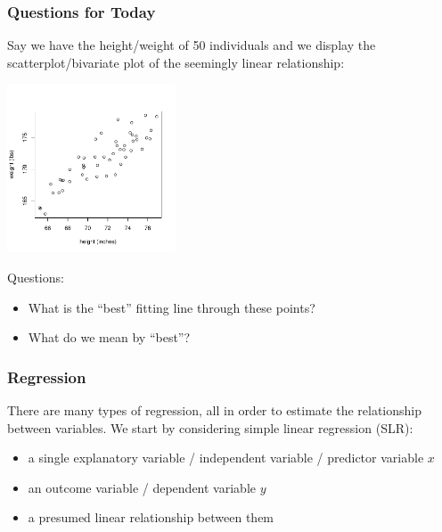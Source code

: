 \documentclass[handout]{beamer}
\newcommand{\blue}[1]{\textcolor{blue2}{#1}}
\begin{document}
\begin{frame}[fragile]
\frametitle{Questions for Today}

Say we have the height/weight of 50 individuals and we display the scatterplot/bivariate plot of the seemingly \blue{linear} relationship:
\begin{center}
\includegraphics[height=5cm]{figure/lec24-002.pdf}
\end{center}
\pause Questions:  
\begin{itemize}
\item What is the ``best'' fitting line through these points?
\item What do we mean by ``best''?
\end{itemize}

\end{frame}


\begin{frame}[fragile]
\frametitle{Regression}
There are many types of \blue{regression}, all in order to estimate the relationship between variables.  
%
%
\vspace{0.5cm}
\pause We start by considering \blue{simple linear regression (SLR)}:
\begin{itemize}
\item a single \blue{explanatory variable / independent variable / predictor variable} $x$
\item an \blue{outcome variable / dependent variable} $y$
\item a presumed linear relationship between them
\end{itemize}

\end{frame}
\end{document}

